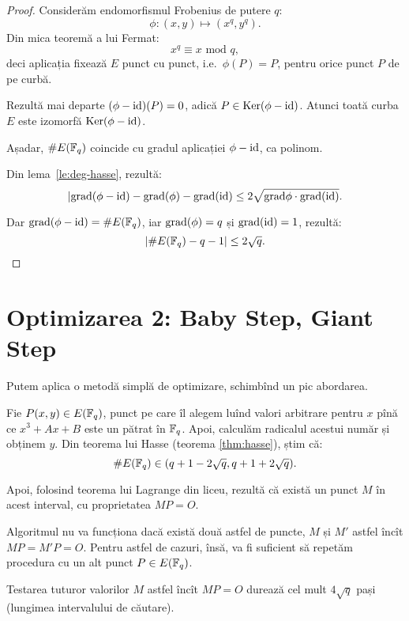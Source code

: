 \begin{proof}
  Considerăm endomorfismul Frobenius de putere $ q $:
  \[
    \phi : (x, y) \mapsto (x^q, y^q).
  \]
  Din mica teoremă a lui Fermat:
  \[
    x^q \equiv x \text{ mod } q,
  \]
  deci aplicația fixează $ E $ punct cu punct, i.e.\ $ \phi(P) = P $,
  pentru orice punct $ P $ de pe curbă.

  Rezultă mai departe $ (\phi - \mathrm{id})(P) = 0 $, adică
  $ P \in \mathrm{Ker}(\phi - \mathrm{id}) $. Atunci toată curba $ E $ este
  izomorfă $ \mathrm{Ker}(\phi - \mathrm{id}) $.

  Așadar, $ \# E(\mathbb{F}_q) $ coincide cu gradul aplicației $ \phi - \mathrm{id} $,
  ca polinom.

  Din lema~\ref{le:deg-hasse}, rezultă:
  \[
    |\dr{grad}(\phi - \dr{id}) - \dr{grad}(\phi) - \dr{grad}(\dr{id}) \leq %
    2 \sqrt{\dr{grad}\phi \cdot \dr{grad}(\dr{id})}.
  \]

  Dar $ \mathrm{grad}(\phi - \mathrm{id}) = \# E(\mathbb{F}_q) $, iar $ \mathrm{grad}(\phi) = q $
  și $ \mathrm{grad}(\mathrm{id}) = 1 $, rezultă:
  \[
    | \# E(\mathbb{F}_q) - q - 1 | \leq 2 \sqrt{q}.
  \]
\end{proof}

\section{Optimizarea 2: Baby Step, Giant Step}

Putem aplica o metodă simplă de optimizare, schimbînd un pic abordarea.

Fie $ P(x, y) \in E(\mathbb{F}_q) $, punct pe care îl alegem luînd valori
arbitrare pentru $ x $ pînă ce $ x^3 + Ax + B $ este un pătrat în $ \mathbb{F}_q $.
Apoi, calculăm radicalul acestui număr și obținem $ y $. Din teorema lui
Hasse (teorema \ref{thm:hasse}), știm că:
\[
  \# E(\mathbb{F}_q) \in (q + 1 - 2 \sqrt{q}, q + 1 + 2 \sqrt{q}).
\]

Apoi, folosind teorema lui Lagrange din liceu, rezultă că există un punct
$ M $ în acest interval, cu proprietatea $ MP = O $.

Algoritmul nu va funcționa dacă există două astfel de puncte, $ M $ și
$ M' $ astfel încît $ MP = M'P = O $. Pentru astfel de cazuri, însă, va
fi suficient să repetăm procedura cu un alt punct $ P \in E(\mathbb{F}_q) $.

Testarea tuturor valorilor $ M $ astfel încît $ MP = O $ durează cel mult
$ 4 \sqrt{q} $ pași (lungimea intervalului de căutare).


